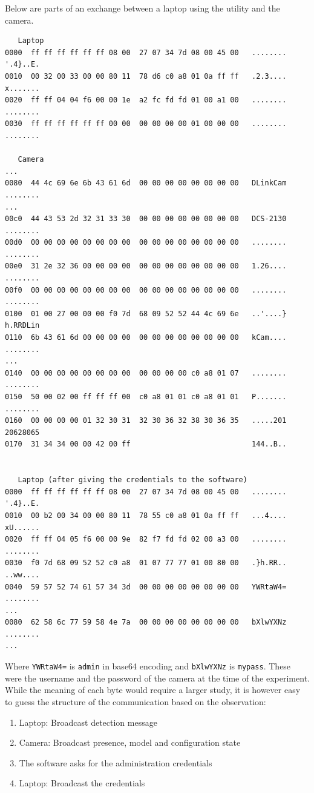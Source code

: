 Below are parts of an exchange between a laptop using the utility and the camera.

{\scriptsize
\begin{verbatim}
   Laptop
0000  ff ff ff ff ff ff 08 00  27 07 34 7d 08 00 45 00   ........ '.4}..E.
0010  00 32 00 33 00 00 80 11  78 d6 c0 a8 01 0a ff ff   .2.3.... x.......
0020  ff ff 04 04 f6 00 00 1e  a2 fc fd fd 01 00 a1 00   ........ ........
0030  ff ff ff ff ff ff 00 00  00 00 00 00 01 00 00 00   ........ ........

   Camera
...
0080  44 4c 69 6e 6b 43 61 6d  00 00 00 00 00 00 00 00   DLinkCam ........
...
00c0  44 43 53 2d 32 31 33 30  00 00 00 00 00 00 00 00   DCS-2130 ........
00d0  00 00 00 00 00 00 00 00  00 00 00 00 00 00 00 00   ........ ........
00e0  31 2e 32 36 00 00 00 00  00 00 00 00 00 00 00 00   1.26.... ........
00f0  00 00 00 00 00 00 00 00  00 00 00 00 00 00 00 00   ........ ........
0100  01 00 27 00 00 00 f0 7d  68 09 52 52 44 4c 69 6e   ..'....} h.RRDLin
0110  6b 43 61 6d 00 00 00 00  00 00 00 00 00 00 00 00   kCam.... ........
...
0140  00 00 00 00 00 00 00 00  00 00 00 00 c0 a8 01 07   ........ ........
0150  50 00 02 00 ff ff ff 00  c0 a8 01 01 c0 a8 01 01   P....... ........
0160  00 00 00 00 01 32 30 31  32 30 36 32 38 30 36 35   .....201 20628065
0170  31 34 34 00 00 42 00 ff                            144..B..         


   Laptop (after giving the credentials to the software)
0000  ff ff ff ff ff ff 08 00  27 07 34 7d 08 00 45 00   ........ '.4}..E.
0010  00 b2 00 34 00 00 80 11  78 55 c0 a8 01 0a ff ff   ...4.... xU......
0020  ff ff 04 05 f6 00 00 9e  82 f7 fd fd 02 00 a3 00   ........ ........
0030  f0 7d 68 09 52 52 c0 a8  01 07 77 77 01 00 80 00   .}h.RR.. ..ww....
0040  59 57 52 74 61 57 34 3d  00 00 00 00 00 00 00 00   YWRtaW4= ........
...
0080  62 58 6c 77 59 58 4e 7a  00 00 00 00 00 00 00 00   bXlwYXNz ........
...
\end{verbatim}
  }


Where \texttt{YWRtaW4=} is \texttt{admin} in base64 encoding and \texttt{bXlwYXNz} is \texttt{mypass}.
These were the username and the password of the camera at the time of the experiment.
While the meaning of each byte would require a larger study, it is however easy to guess the structure of the communication based on the observation:

\begin{enumerate}
\item Laptop: Broadcast detection message
\item Camera: Broadcast presence, model and configuration state
\item The software asks for the administration credentials
\item Laptop: Broadcast the credentials
\end{enumerate}

